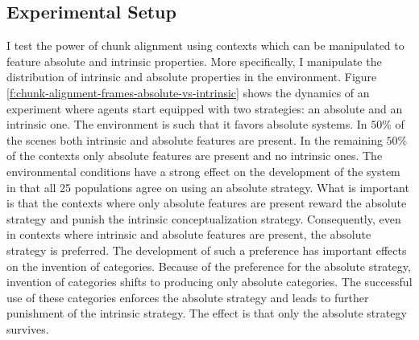 \subsection{Experimental Setup}
I test the power of chunk alignment using contexts which can be manipulated to feature 
absolute and intrinsic properties. More specifically, I manipulate the distribution of intrinsic and 
absolute properties in the environment. Figure \ref{f:chunk-alignment-frames-absolute-vs-intrinsic} 
shows the dynamics of an experiment where agents start equipped with two strategies: an absolute
and an intrinsic one. The environment is such that it favors absolute systems. In $50\%$ of the 
scenes both intrinsic and absolute features are present. In the remaining $50\%$ of the contexts
only absolute features are present and no intrinsic ones. The environmental
conditions have a strong effect on the development of the system in that all 25 populations
agree on using an absolute strategy. What is important is that the contexts where
only absolute features are present reward the absolute strategy and punish the intrinsic 
conceptualization strategy. Consequently, even in contexts where intrinsic and absolute features 
are present, the absolute strategy is preferred. The development of such a preference
has important effects on the invention of categories. Because of the preference for 
the absolute strategy, invention of categories shifts to producing only absolute categories.
The successful use of these categories enforces the absolute strategy and leads to further
punishment of the intrinsic strategy. The effect is that only the absolute strategy survives.

